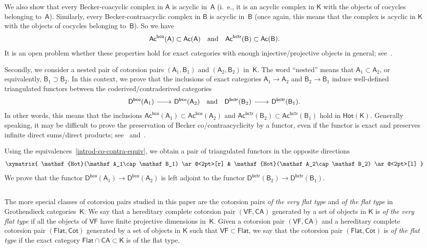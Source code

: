 \documentclass[12pt,a4paper]{amsart}
\newcommand{\+}{\nobreakdash-}
\renewcommand{\:}{\colon}
\newcommand{\rarrow}{\longrightarrow}
\newcommand{\lrarrow}{\mskip.5\thinmuskip\relbar\joinrel\relbar\joinrel
 \rightarrow\mskip.5\thinmuskip\relax}
\newcommand{\sA}{\mathsf A}
\newcommand{\sB}{\mathsf B}
\newcommand{\sD}{\mathsf D}
\newcommand{\sK}{\mathsf K}
\newcommand{\VF}{\mathsf{VF}}
\newcommand{\CA}{\mathsf{CA}}
\newcommand{\Flat}{\mathsf{Flat}}
\newcommand{\Cot}{\mathsf{Cot}}
\newcommand{\Hot}{\mathsf{Hot}}
\newcommand{\Ac}{\mathsf{Ac}}
\newcommand{\bco}{\mathsf{bco}}
\newcommand{\bctr}{\mathsf{bctr}}
\theoremstyle{plain}
\theoremstyle{definition}
\begin{document}
 We also show that every Becker-coacyclic complex in $\sA$ is acyclic
in~$\sA$ (i.~e., it is an acyclic complex in $\sK$ with the objects of
cocycles belonging to~$\sA$).
 Similarly, every Becker-contraacyclic complex in $\sB$ is acyclic
in~$\sB$ (once again, this means that the complex is acyclic in $\sK$
with the objects of cocycles belonging to~$\sB$).
 So we have
$$
 \Ac^\bco(\sA)\subset\Ac(\sA)
 \quad\textup{and}\quad
 \Ac^\bctr(\sB)\subset\Ac(\sB).
$$
 It is an open problem whether these properties hold for exact
categories with enough injective/projective objects in general;
see~\cite[Lemma~B.7.3 and Remark~B.7.4]{Pcosh}.

 Secondly, we consider a nested pair of cotorsion pairs $(\sA_1,\sB_1)$
and $(\sA_2,\sB_2)$ in~$\sK$.
 The word ``nested'' means that $\sA_1\subset\sA_2$, or equivalently,
$\sB_1\supset\sB_2$.
 In this context, we prove that the inclusions of exact categories
$\sA_1\rarrow\sA_2$ and $\sB_2\rarrow\sB_1$ induce well-defined
triangulated functors between the coderived/contraderived categories
$$
 \sD^\bco(\sA_1)\lrarrow\sD^\bco(\sA_2)
 \quad\text{and}\quad
 \sD^\bctr(\sB_2)\lrarrow\sD^\bctr(\sB_1).
$$
 In other words, this means that the inclusions
$\Ac^\bco(\sA_1)\subset\Ac^\bco(\sA_2)$ and $\Ac^\bctr(\sB_2)\subset
\Ac^\bctr(\sB_1)$ hold in $\Hot(\sK)$.
 Generally speaking, it may be difficult to prove the preservation
of Becker co/contraacyclicity by a functor, even if the functor
is exact and preserves infinite direct sums/direct products;
see~\cite[Lemma~B.7.5]{Pcosh} and~\cite[Lemmas~7.16\+-7.17,
Sections~7.9 and~8, and Remarks~11.18 and~11.29]{Pdomc}.

 Using the equivalences~\eqref{introd-co-contra-equiv}, we obtain
a pair of triangulated functors in the opposite directions
$$
 \xymatrix{
  \Hot(\sA_1\cap\sB_1) \ar@<2pt>[r] &
  \Hot(\sA_2\cap\sB_2) \ar@<2pt>[l]
 }
$$
 We prove that the functor $\sD^\bco(\sA_1)\rarrow\sD^\bco(\sA_2)$ is 
left adjoint to the functor $\sD^\bctr(\sB_2)\rarrow\sD^\bctr(\sB_1)$.

\subsection{{}}
 The more special classes of cotorsion pairs studied in this paper are
the cotorsion pairs \emph{of the very flat type} and \emph{of the flat
type} in Grothendieck categories~$\sK$.
 We say that a hereditary complete cotorsion pair $(\VF,\CA)$ generated
by a set of objects in $\sK$ is \emph{of the very flat type} if all
the objects of $\VF$ have finite projective dimensions in~$\sK$.
 Given a cotorsion pair $(\VF,\CA)$ and a hereditary complete cotorsion
pair $(\Flat,\Cot)$ generated by a set of objects in $\sK$ such that
$\VF\subset\Flat$, we say that the cotorsion pair $(\Flat,\Cot)$ is
\emph{of the flat type} if the exact category $\Flat\cap\CA\subset\sK$
is of the flat type.
\end{document}

